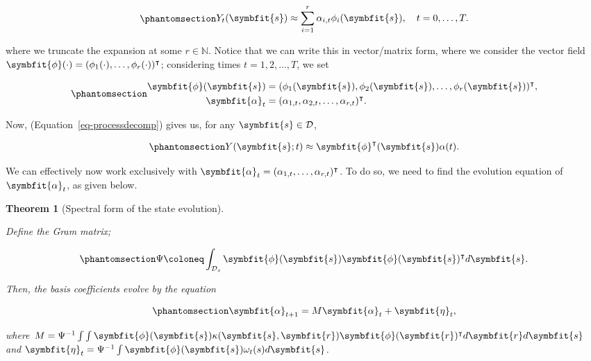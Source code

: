 \documentclass[
]{report}
\newcommand{\bv}[1]{\symbfit{#1}}
\theoremstyle{plain}
\theoremstyle{plain}
\newtheorem{theorem}{Theorem}[section]
\theoremstyle{remark}
\begin{document}
\begin{equation}\phantomsection\label{eq-processdecomp}{\begin{split}
Y_t(\bv s) \approx \sum_{i=1}^{r} \alpha_{i,t} \phi_i(\bv s), \quad t=0,\dots,T.
\end{split}
}\end{equation}

where we truncate the expansion at some \(r\in\mathbb N\). Notice that
we can write this in vector/matrix form, where we consider the vector
field
\(\bv \phi(\cdot) = (\phi_1(\cdot),\dots, \phi_r(\cdot))^\intercal\);
considering times \(t=1,2,\dots, T\), we set

\begin{equation}\phantomsection\label{eq-vecmats}{\begin{split}
\bv \phi(\bv s) &= (\phi_1(\bv s), \phi_2(\bv s), \dots, \phi_r(\bv s))^{\intercal},\\
\bv \alpha_t &= (\alpha_{1,t}, \alpha_{2,t}, \dots, \alpha_{r, t})^{\intercal}.
\end{split}
}\end{equation}

Now, (Equation~\ref{eq-processdecomp}) gives us, for any
\(\bv s\in \mathcal D\),

\begin{equation}\phantomsection\label{eq-pbvec}{\begin{split}
Y(\bv s; t) \approx \bv \phi^{\intercal}(\bv s)  \alpha(t).\\
\end{split}
}\end{equation}

We can effectively now work exclusively with
\(\bv \alpha_t = (\alpha_{1,t},\dots, \alpha_{r,t})^\intercal\). To do
so, we need to find the evolution equation of \(\bv \alpha_t\), as given
below.

\begin{theorem}[Spectral form of the state
evolution]\protect\hypertarget{thm-state_form}{}\label{thm-state_form}

Define the \emph{Gram matrix};

\begin{equation}\phantomsection\label{eq-gram}{\Psi \coloneq \int_{\mathcal D_s} \bv \phi(\bv s) \bv \phi(\bv s)^\intercal d\bv s.
}\end{equation}

Then, the basis coefficients evolve by the equation

\begin{equation}\phantomsection\label{eq-stateev}{\bv \alpha_{t+1} = M \bv\alpha_t + \bv\eta_t,
}\end{equation}

where
\(M = \Psi^{-1} \int\int \bv\phi(\bv s) \kappa(\bv s, \bv r)\bv\phi(\bv r)^\intercal d\bv r d \bv s\)
and \(\bv\eta_t =\Psi^{-1} \int \bv \phi(\bv s)\omega_t(s)d\bv s\).

\end{theorem}
\end{document}
